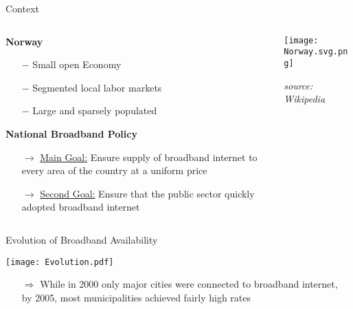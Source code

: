 \documentclass[compress, aspectratio=169, xcolor=dvipsnames]{beamer}
\begin{document}
\begin{frame}{Context}


\begin{columns}
\begin{column}{0.6\textwidth}

\textbf{Norway}
\begin{itemize}
	\item[$-$] Small open Economy
	\item[$-$] Segmented local labor markets
	\item[$-$] Large and sparsely populated
\end{itemize}

\vspace{10pt}
\textbf{National Broadband Policy}
\begin{itemize}
	\item[$\rightarrow$] \underline{Main Goal:} Ensure supply of broadband internet to every area of the country at a uniform price
	\item[$\rightarrow$] \underline{Second Goal:} Ensure that the public sector quickly adopted broadband internet

\end{itemize}
	
\end{column}

\begin{column}{0.3\textwidth}  %
    \begin{center}
     \texttt{[image: Norway.svg.png]}
     
     \scriptsize{\textit{source: \\ Wikipedia}}
     \end{center}
\end{column}
\end{columns}
	
\end{frame}

\begin{frame}{Evolution of Broadband Availability}
	\begin{center}
     \texttt{[image: Evolution.pdf]}
     \end{center}
     \vspace{-10pt}
     \begin{itemize}
     	\item[$\Rightarrow$] While in 2000 only major cities were connected to broadband internet, \\by 2005, most municipalities achieved fairly high rates
     \end{itemize}
      
\end{frame}
\end{document}
